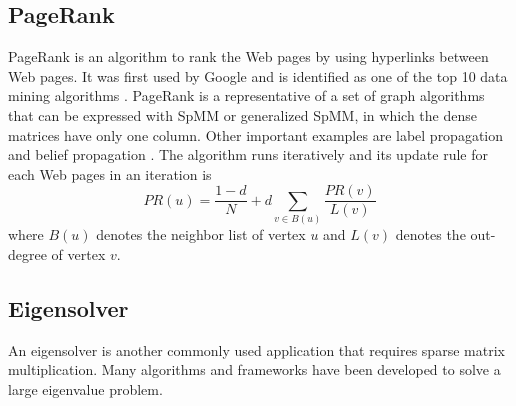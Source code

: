 \subsection{PageRank} \label{sec:pagerank}
PageRank is an algorithm to rank the Web pages by using hyperlinks between Web
pages. It was first used by Google and is identified as one of the top 10 data
mining algorithms \cite{top10}. PageRank is a representative of a set of graph
algorithms that can be expressed with SpMM or generalized SpMM, in which
the dense matrices have only one column. Other important examples are label propagation
\cite{label_prop} and belief propagation \cite{Yedidia03}. The algorithm runs
iteratively and its update rule for each Web pages in an iteration is
\begin{equation*}
PR(u) = \frac{1-d}{N} + d \sum\limits_{v \in B(u)} \frac{PR(v)}{L(v)}
\end{equation*}
where $B(u)$ denotes the neighbor list of vertex $u$ and $L(v)$ denotes
the out-degree of vertex $v$. %




\subsection{Eigensolver}
An eigensolver is another commonly used application that requires sparse matrix
multiplication. Many algorithms \cite{Lanczos, IRLM, krylovschur} and frameworks
\cite{arpack, anasazi, slepc} have been developed to solve a large eigenvalue
problem.

